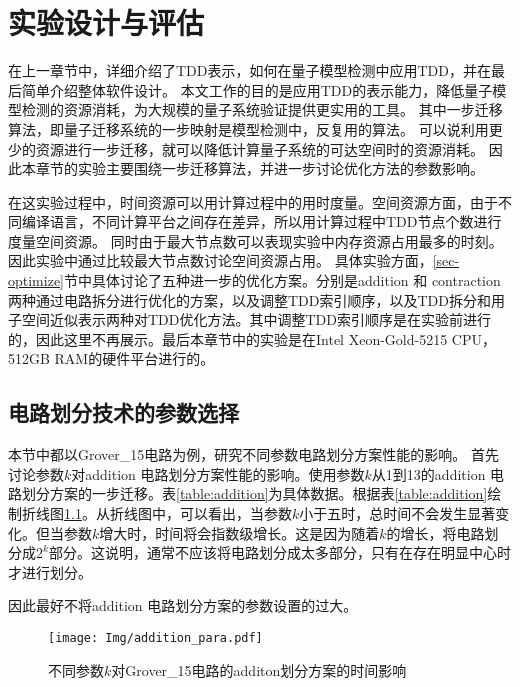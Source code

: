 \chapter{实验设计与评估}
在上一章节中，详细介绍了TDD表示，如何在量子模型检测中应用TDD，并在最后简单介绍整体软件设计。
本文工作的目的是应用TDD的表示能力，降低量子模型检测的资源消耗，为大规模的量子系统验证提供更实用的工具。
其中一步迁移算法，即量子迁移系统的一步映射是模型检测中，反复用的算法。
可以说利用更少的资源进行一步迁移，就可以降低计算量子系统的可达空间时的资源消耗。
因此本章节的实验主要围绕一步迁移算法，并进一步讨论优化方法的参数影响。

在这实验过程中，时间资源可以用计算过程中的用时度量。空间资源方面，由于不同编译语言，不同计算平台之间存在差异，所以用计算过程中TDD节点个数进行度量空间资源。
同时由于最大节点数可以表现实验中内存资源占用最多的时刻。因此实验中通过比较最大节点数讨论空间资源占用。
具体实验方面，\ref{sec-optimize}节中具体讨论了五种进一步的优化方案。分别是addition 和 contraction 两种通过电路拆分进行优化的方案，以及调整TDD索引顺序，以及TDD拆分和用子空间近似表示两种对TDD优化方法。其中调整TDD索引顺序是在实验前进行的，因此这里不再展示。最后本章节中的实验是在Intel Xeon-Gold-5215 CPU，512GB RAM的硬件平台进行的。
\section{电路划分技术的参数选择}
\label{sec-para}
本节中都以Grover\_15电路为例，研究不同参数电路划分方案性能的影响。
首先讨论参数$k$对addition 电路划分方案性能的影响。使用参数$k$从1到13的addition 电路划分方案的一步迁移。表\ref{table:addition}为具体数据。根据表\ref{table:addition}绘制折线图\ref{fig:addition-ex}。从折线图中，可以看出，当参数$k$小于五时，总时间不会发生显著变化。但当参数$k$增大时，时间将会指数级增长。这是因为随着$k$的增长，将电路划分成$2^k$部分。这说明，通常不应该将电路划分成太多部分，只有在存在明显中心时才进行划分。

因此最好不将addition 电路划分方案的参数设置的过大。
\begin{figure}
    \centering
    \texttt{[image: Img/addition\_para.pdf]}
    \caption{不同参数$k$对Grover\_15电路的additon划分方案的时间影响}
    \label{fig:addition-ex}
\end{figure}
\begin{table}[htbp]
    \centering
    \caption{对grover\_15应用不同的addition参数的时间对比。}
    \label{table:addition}
\end{table}



